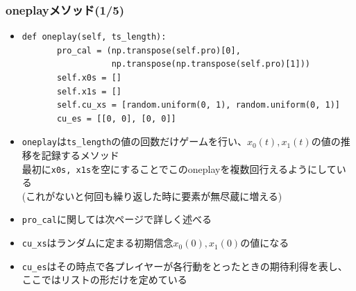 \documentclass[dvipdfmx,fleqn,handout]{beamer}
\begin{document}
\begin{frame}[fragile]%
\frametitle{oneplayメソッド(1/5)}
\begin{itemize}\setlength{\parskip}{0.5em}
\item

\footnotesize
\begin{verbatim}
def oneplay(self, ts_length):
       pro_cal = (np.transpose(self.pro)[0],
                  np.transpose(np.transpose(self.pro)[1]))
       self.x0s = []
       self.x1s = []
       self.cu_xs = [random.uniform(0, 1), random.uniform(0, 1)]
       cu_es = [[0, 0], [0, 0]]
 \end{verbatim}\pause
\normalsize

\item
\verb|oneplay|は\verb|ts_length|の値の回数だけゲームを行い、$x_0(t),x_1(t)$の値の推移を記録するメソッド\pause\\
最初に\verb|x0s, x1s|を空にすることでこのoneplayを複数回行えるようにしている\\
(これがないと何回も繰り返した時に要素が無尽蔵に増える)\pause
\item
\verb|pro_cal|に関しては次ページで詳しく述べる
\item
\verb|cu_xs|はランダムに定まる初期信念$x_0(0),x_1(0)$の値になる\pause
\item
\verb|cu_es|はその時点で各プレイヤーが各行動をとったときの期待利得を表し、ここではリストの形だけを定めている
\end{itemize}
\end{frame}
\end{document}
